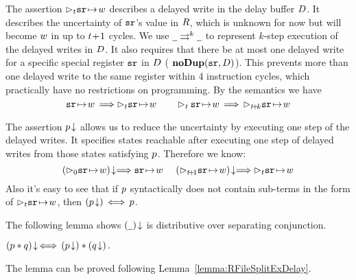 

The assertion $\rhd_{t}{\texttt{sr}} \!\mapsto\! {w}$ describes a delayed
write in the delay buffer $D$. It describes the
uncertainty of $\texttt{sr}$'s value in $R$, which is unknown
for now but will become $w$ in up to $t\!+\!1$ cycles.
We use ${\underline{\ \,}}\rightrightarrows^{k}{\underline{\ \,}}$
to represent $k$-step execution of the delayed writes in $D$.
It also requires that there be
at most one delayed write for a specific special register $\texttt{sr}$
in $D$ (\ie{} $\textbf{noDup}({\texttt{sr}}, {D})$).
This prevents more than one delayed write to
the same register within 4 instruction cycles, which practically
have no restrictions on programming.
By the semantics we have
$$
\regst{\sr}{\word} \,\Longrightarrow \dlyregst{\tick}{\sr}{\word}
\qquad
\dlyregst{\tick}{\sr}{\word} \,\Longrightarrow\,
\dlyregst{\tick\!+\!k}{\sr}{\word}
$$

The assertion ${p}\!\downarrow$ allows us to reduce the uncertainty
by executing one step of the delayed writes.
It specifies states reachable after executing
one step of delayed writes from those states satisfying $p$.
Therefore we know:
$$
\nxtAst{(\dlyregst{0}{\sr}{\word})} \Longrightarrow
\regst{\sr}{\word}
\quad \
\nxtAst{(\dlyregst{\tick\!+\!1}{\sr}{\word})} \Longrightarrow
\dlyregst{\tick}{\sr}{\word}
$$
Also it's easy to see that if $p$ syntactically
does not contain sub-terms in the form of $\rhd_{t}{\texttt{sr}} \!\mapsto\! {w}$,
then $({p}\!\downarrow) \,\Longleftrightarrow \,p$.

The following lemma shows ${(\underline{\ \,})}\!\downarrow$ is distributive
over separating conjunction.
\begin{lemma} %
\label{lemma:dly-sep-split}
$
{(p * q)}\!\downarrow \,\Longleftrightarrow\, ({p}\!\downarrow) * ({q}\!\downarrow)\,.
$
\end{lemma}
The lemma can be proved following Lemma~\ref{lemma:RFileSplitExDelay}.


